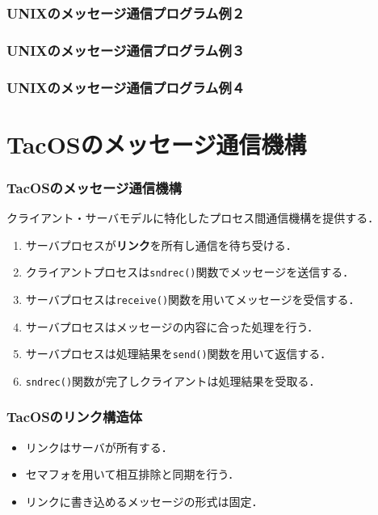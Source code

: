 \documentclass{beamer}                   %
\begin{document}
\begin{frame}
  \frametitle{UNIXのメッセージ通信プログラム例２}
\end{frame}

\begin{frame}
  \frametitle{UNIXのメッセージ通信プログラム例３}
\end{frame}

\begin{frame}
  \frametitle{UNIXのメッセージ通信プログラム例４}
\end{frame}

\section{TacOSのメッセージ通信機構}
\begin{frame}
  \frametitle{TacOSのメッセージ通信機構}
  クライアント・サーバモデルに特化したプロセス間通信機構を提供する．
  \begin{enumerate}
  \item サーバプロセスが{\bf リンク}を所有し通信を待ち受ける．
  \item クライアントプロセスは{\tt sndrec()}関数でメッセージを送信する．
  \item サーバプロセスは{\tt receive()}関数を用いてメッセージを受信する．
  \item サーバプロセスはメッセージの内容に合った処理を行う．
  \item サーバプロセスは処理結果を{\tt send()}関数を用いて返信する．
  \item {\tt sndrec()}関数が完了しクライアントは処理結果を受取る．
  \end{enumerate}
\end{frame}

\begin{frame}
  \frametitle{TacOSのリンク構造体}
  \begin{itemize}
  \item リンクはサーバが所有する．
  \item セマフォを用いて相互排除と同期を行う．
  \item リンクに書き込めるメッセージの形式は固定．
  \end{itemize}
\end{frame}
\end{document}
